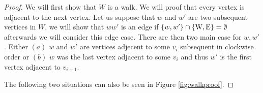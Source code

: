 
\begin{proof}
We will first show that $W$ is a walk. We will proof that every vertex is adjacent to the next vertex. Let us suppose that $w$ and $w'$ are two subsequent vertices in $W$, we will show that $ww'$ is an edge if $\left\lbrace {w, w'} \right\rbrace \cap \left\lbrace {\mathrm{W}, \mathrm{E}} \right\rbrace = \emptyset$ afterwards we will consider this edge case. There are then two main case for $w, w'$. Either $(a)$ $w$ and $w'$ are vertices adjecent to some $v_i$ subsequent in clockwise order or $(b)$ $w$ was the last vertex adjacent to some $v_i$ and thus $w'$ is the first vertex adjacent to $v_{i+1}$.

The following two situations can also be seen in Figure \ref{fig:walkproof}.


\end{proof}
